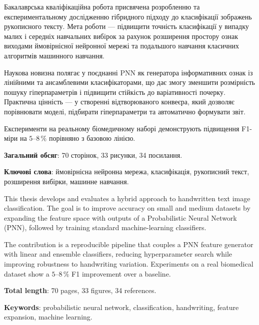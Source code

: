 \documentclass{article}
\begin{document}
\begin{uaabstract}
  Бакалаврська кваліфікаційна робота присвячена розробленню та експериментальному
  дослідженню гібридного підходу до класифікації зображень рукописного тексту. Мета роботи —
  підвищити точність класифікації у випадку малих і середніх навчальних вибірок за рахунок
  розширення простору ознак виходами ймовірнісної нейронної мережі та подальшого навчання
  класичних алгоритмів машинного навчання.

  Наукова новизна полягає у поєднанні PNN як генератора інформативних ознак із
  лінійними та ансамблевими класифікаторами, що дає змогу зменшити розмірність пошуку
  гіперпараметрів і підвищити стійкість до варіативності почерку. Практична цінність — у створенні
  відтворюваного конвеєра, який дозволяє порівнювати моделі, підбирати гіперпараметри та
  автоматично формувати звіт.

  Експерименти на реальному біомедичному наборі демонструють підвищення F1-міри на
  $5$–$8\,\%$ порівняно з базовою лінією.

  \textbf{Загальний обсяг}: 70 сторінок, 33 рисунки, 34 посилання.

  \textbf{Ключові слова}: ймовірнісна нейронна мережа, класифікація, рукописний текст, розширення
  вибірки, машинне навчання.
\end{uaabstract}

\begin{enabstract}
  This thesis develops and evaluates a hybrid approach to handwritten text image classification.
  The goal is to improve accuracy on small and medium datasets by expanding the feature space with
  outputs of a Probabilistic Neural Network (PNN), followed by training standard machine-learning
  classifiers.

  The contribution is a reproducible pipeline that couples a PNN feature generator with linear
  and ensemble classifiers, reducing hyperparameter search while improving robustness to handwriting
  variation. Experiments on a real biomedical dataset show a $5$–$8\,\%$ F1 improvement over a
  baseline.

  \textbf{Total length}: 70 pages, 33 figures, 34 references.

  \textbf{Keywords}: probabilistic neural network, classification, handwriting, feature expansion, machine learning.
\end{enabstract}
\end{document}
